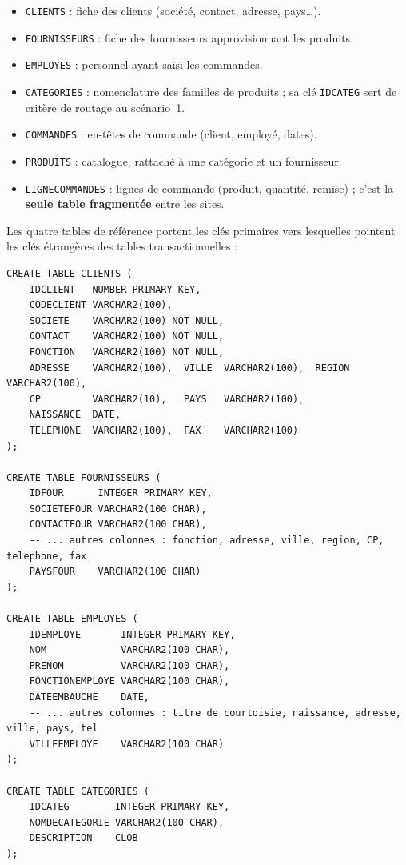 \documentclass[11pt,a4paper]{article}
\begin{document}
\begin{itemize}[leftmargin=1.4cm]
  \item \texttt{CLIENTS} : fiche des clients (société, contact, adresse, pays\ldots).
  \item \texttt{FOURNISSEURS} : fiche des fournisseurs approvisionnant les produits.
  \item \texttt{EMPLOYES} : personnel ayant saisi les commandes.
  \item \texttt{CATEGORIES} : nomenclature des familles de produits ; sa clé
        \texttt{IDCATEG} sert de critère de routage au scénario~1.
  \item \texttt{COMMANDES} : en-têtes de commande (client, employé, dates).
  \item \texttt{PRODUITS} : catalogue, rattaché à une catégorie et un fournisseur.
  \item \texttt{LIGNECOMMANDES} : lignes de commande (produit, quantité, remise) ;
        c'est la \textbf{seule table fragmentée} entre les sites.
\end{itemize}

Les quatre tables de référence portent les clés primaires vers lesquelles
pointent les clés étrangères des tables transactionnelles :

\begin{lstlisting}[style=sql,caption={Tables de référence du schéma global (extrait de \texttt{02\_create\_table.sql}).},label={lst:schema-ref}]
CREATE TABLE CLIENTS (
    IDCLIENT   NUMBER PRIMARY KEY,
    CODECLIENT VARCHAR2(100),
    SOCIETE    VARCHAR2(100) NOT NULL,
    CONTACT    VARCHAR2(100) NOT NULL,
    FONCTION   VARCHAR2(100) NOT NULL,
    ADRESSE    VARCHAR2(100),  VILLE  VARCHAR2(100),  REGION VARCHAR2(100),
    CP         VARCHAR2(10),   PAYS   VARCHAR2(100),
    NAISSANCE  DATE,
    TELEPHONE  VARCHAR2(100),  FAX    VARCHAR2(100)
);

CREATE TABLE FOURNISSEURS (
    IDFOUR      INTEGER PRIMARY KEY,
    SOCIETEFOUR VARCHAR2(100 CHAR),
    CONTACTFOUR VARCHAR2(100 CHAR),
    -- ... autres colonnes : fonction, adresse, ville, region, CP, telephone, fax
    PAYSFOUR    VARCHAR2(100 CHAR)
);

CREATE TABLE EMPLOYES (
    IDEMPLOYE       INTEGER PRIMARY KEY,
    NOM             VARCHAR2(100 CHAR),
    PRENOM          VARCHAR2(100 CHAR),
    FONCTIONEMPLOYE VARCHAR2(100 CHAR),
    DATEEMBAUCHE    DATE,
    -- ... autres colonnes : titre de courtoisie, naissance, adresse, ville, pays, tel
    VILLEEMPLOYE    VARCHAR2(100 CHAR)
);

CREATE TABLE CATEGORIES (
    IDCATEG        INTEGER PRIMARY KEY,
    NOMDECATEGORIE VARCHAR2(100 CHAR),
    DESCRIPTION    CLOB
);
\end{lstlisting}
\end{document}
